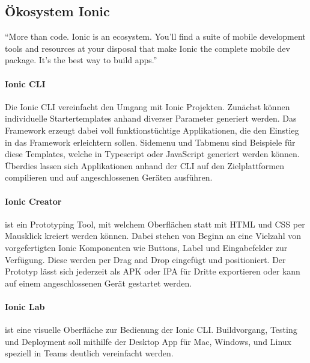 \vspace{1cm}

\vspace{1cm}


\subsection{Ökosystem Ionic}

``More than code. Ionic is an ecosystem. You'll find a suite of mobile development tools and resources at your disposal that make
Ionic the complete mobile dev package. It's the best way to build apps.'' \cite{Ionic20:online}
\vspace{0.5cm}

\paragraph{Ionic \ac{CLI}}
Die Ionic \ac{CLI} vereinfacht den Umgang mit Ionic Projekten. Zunächst können individuelle
Startertemplates anhand diverser Parameter generiert werden.
Das Framework erzeugt dabei voll funktionstüchtige Applikationen, die den Einstieg in das Framework erleichtern sollen.
Sidemenu und Tabmenu sind Beispiele für diese Templates, welche in Typescript oder JavaScript generiert werden können.
Überdies lassen sich Applikationen anhand der \ac{CLI} auf den Zielplattformen compilieren und auf angeschlossenen Geräten ausführen.

\paragraph{Ionic Creator}
ist ein Prototyping Tool, mit welchem Oberflächen statt
mit HTML und CSS per Mausklick kreiert werden können.
Dabei stehen von Beginn an eine Vielzahl von vorgefertigten Ionic Komponenten wie Buttons,
Label und Eingabefelder zur Verfügung.
Diese werden per Drag and Drop eingefügt und positioniert. Der Prototyp lässt sich jederzeit
als \ac{APK} oder \ac{IPA} für Dritte exportieren oder kann auf einem angeschlossenen Gerät gestartet werden.

\paragraph{Ionic Lab}
ist eine visuelle Oberfläche zur Bedienung der Ionic \ac{CLI}.
Buildvorgang, Testing und Deployment soll mithilfe der Desktop App für Mac, Windows, und
Linux speziell in Teams deutlich vereinfacht werden. \cite{Ionic75:online}

